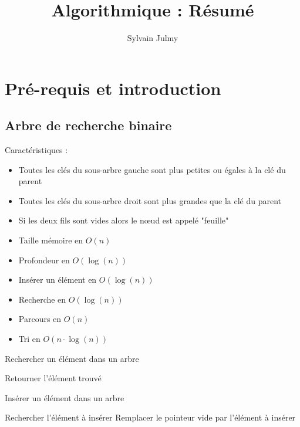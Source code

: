 \documentclass[11pt,a4paper]{report}
\author{Sylvain Julmy}
\title{Algorithmique : Résumé}
\begin{document}
\maketitle
\chapter{Pré-requis et introduction}

\section{Arbre de recherche binaire}
Caractéristiques :
\begin{itemize}
    \item Toutes les clés du sous-arbre gauche sont plus petites ou égales à la clé du parent
    \item Toutes les clés du sous-arbre droit sont plus grandes que la clé du parent
    \item Si les deux fils sont vides alors le nœud est appelé "feuille"
\end{itemize}

\begin{itemize}
    \item Taille mémoire en $O(n)$
    \item Profondeur en $O(\log(n))$
    \item Insérer un élément en $O(\log(n))$
    \item Recherche en $O(\log(n))$
    \item Parcours en $O(n)$
    \item Tri en $O(n\cdot\log(n))$
\end{itemize}

\begin{algorithm}[H]
\caption{Rechercher un élément dans un arbre}
Retourner l'élément trouvé 
\end{algorithm}



\begin{algorithm}[H]
\caption{Insérer un élément dans un arbre}
Rechercher l'élément à insérer 
Remplacer le pointeur vide par l'élément à insérer\;
\end{algorithm}
\end{document}
